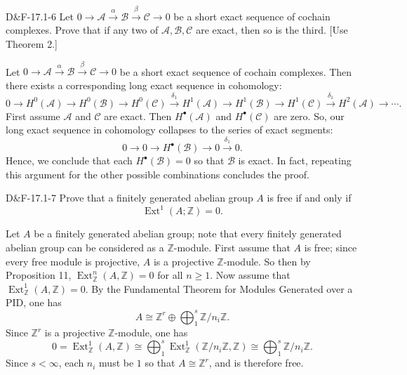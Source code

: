 \documentclass{article}
\begin{document}
	\begin{prb}{D\&F-17.1-6}
		Let $0 \to \mathcal{A} \xrightarrow{\alpha} \mathcal{B} \xrightarrow{\beta} \mathcal{C} \to 0$ be a short exact sequence of cochain complexes. Prove that if any two of $\mathcal{A}, \mathcal{B}, \mathcal{C}$ are exact, then so is the third. [Use Theorem 2.]
	\end{prb}
	Let $0 \to \mathcal{A} \xrightarrow{\alpha} \mathcal{B} \xrightarrow{\beta} \mathcal{C} \to 0$ be a short exact sequence of cochain complexes. Then there exists a corresponding long exact sequence in cohomology: 
	\begin{equation*}
		0 \to H^{0}(\mathcal{A}) \to H^{0}(\mathcal{B}) \to H^{0}(\mathcal{C}) \xrightarrow{\delta_{1}} H^{1}(\mathcal{A}) \to H^{1}(\mathcal{B}) \to H^{1}(\mathcal{C}) \xrightarrow{\delta_{1}} H^{2}(\mathcal{A}) \to \dotsm. 
	\end{equation*}
	First assume $\mathcal{A}$ and $\mathcal{C}$ are exact. Then $H^{\bullet}(\mathcal{A})$ and $H^{\bullet}(\mathcal{C})$ are zero. So, our long exact sequence in cohomology collapses to the series of exact segments: 
	\begin{equation*}
		0 \to  0 \to H^{\bullet}(\mathcal{B}) \to 0 \xrightarrow{\delta_{1}} 0. 
	\end{equation*}
	Hence, we conclude that each $H^{\bullet}(\mathcal{B}) = 0$ so that $\mathcal{B}$ is exact. In fact, repeating this argument for the other possible combinations concludes the proof. 
	\begin{prb}{D\&F-17.1-7}
		Prove that a finitely generated abelian group $A$ is free if and only if $$\operatorname{Ext}^{1}(A;\mathbb{Z}) = 0.$$ 
	\end{prb}
	Let $A$ be a finitely generated abelian group; note that every finitely generated abelian group can be considered as a $\mathbb{Z}$-module. First assume that $A$ is free; since every free module is projective, $A$ is a projective $\mathbb{Z}$-module. So then by Proposition 11, $\operatorname{Ext}^{n}_{\mathbb{Z}}(A, \mathbb{Z}) = 0$ for all $n \geq 1$. Now assume that $\operatorname{Ext}^{1}_{\mathbb{Z}}(A, \mathbb{Z}) = 0$. By the Fundamental Theorem for Modules Generated over a PID, one has 
	\begin{equation*}
		A \cong \mathbb{Z}^{r} \oplus \bigoplus_{1}^{s}\mathbb{Z}/n_{i}\mathbb{Z}.
	\end{equation*}
	Since $\mathbb{Z}^{r}$ is a projective $\mathbb{Z}$-module, one has 
	\begin{equation*}
		0 = \operatorname{Ext}^{1}_{\mathbb{Z}}(A, \mathbb{Z}) \cong \bigoplus_{1}^{s}\operatorname{Ext}^{1}_{\mathbb{Z}}(\mathbb{Z}/n_{i}\mathbb{Z}, \mathbb{Z}) \cong \bigoplus_{1}^{s}\mathbb{Z}/n_{i}\mathbb{Z}. 
	\end{equation*}
	Since $s < \infty$, each $n_{i}$ must be $1$ so that $A \cong \mathbb{Z}^{r}$, and is therefore free. 
	
\end{document}
